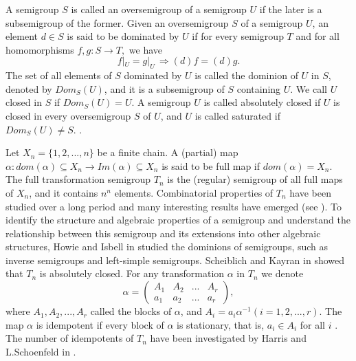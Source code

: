 \documentclass[10pt]{extarticle}
\numberwithin{equation}{section}
\numberwithin{bbb}{section}
\numberwithin{equation}{section}
\begin{document}
A semigroup $S$ is called an oversemigroup of a semigroup $U$ if the later is a subsemigroup of the former. Given an oversemigroup $S$ of a semigroup $U$, an element $d\in S$ is said to be dominated by $U$ if for every semigroup $T$ and for all homomorphisms $f,g : S \rightarrow T,$ we have
 $$f|_U=g|_U \, \Longrightarrow (d)f=(d)g.$$   
The set of all elements of $S$ dominated by $U$ is called the dominion of $U$ in $S$, denoted by $Dom_{S}(U)$, and it is a subsemigroup of $S$ containing $U$. We call $U$ closed in $S$ if $Dom_{S}(U)=U$. A semigroup $U$ is called absolutely closed if $U$ is closed in every oversemigroup $S$ of $U$, and $U$ is called saturated if $Dom_{S}(U)\neq S.$ \cite{RI}.

Let $X_n=\{1,2,...,n\}$ be a finite chain. A (partial) map $\alpha:dom(\alpha)\subseteq X_n\rightarrow Im(\alpha)\subseteq X_n$ is said to be full map if $dom(\alpha)=X_n$. The full transformation semigroup $T_n$ is the (regular) semigroup of all full maps of $X_n$, and it contains $n^n$ elements. Combinatorial properties of $T_n$ have been studied over a long period and many interesting results have emerged (see \cite{6,14,12,16,1}). To identify the structure and algebraic properties of a semigroup and understand the relationship between this semigroup and its extensions into other algebraic structures, Howie and Isbell in \cite{13} studied the dominions of semigroups, such as inverse semigroups and left-simple semigroups. Scheiblich and Kayran in \cite{30} showed that $T_n$ is absolutely closed. For any transformation $\alpha$ in $T_n$ we denote
$$\alpha=
\begin{pmatrix}  A_1&A_2&...&A_r\\a_1&a_2&...&a_r
\end{pmatrix},$$
where $A_1,A_2,...,A_r$ called the blocks of $\alpha$, and $A_i=a_i\alpha^{-1}$$(i=1,2,...,r)$. The map $\alpha$ is idempotent if every block of $\alpha$ is stationary, that is, $a_i\in A_i$ for all $i$ \cite{16}. The number of idempotents of $T_n$ have been investigated by Harris and  L.Schoenfeld in \cite{10,11}.
\end{document}
